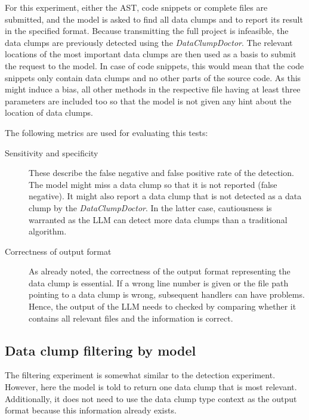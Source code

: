 For this experiment, either the \ac{AST}, code snippets or complete files are submitted, and the model is asked to find all data clumps and to report its result in the specified format.
Because transmitting the full project is infeasible, the data clumps are previously detected using the \textit{DataClumpDoctor}. The relevant locations of the most important data clumps are then used as a basis to submit the request to the model. In case of code snippets, this would mean that the code snippets only contain data clumps and no other parts of the source code. As this might induce a bias, all other methods in the respective file having at least three parameters are included too so that the model is not given any hint about the location of data clumps. 


The following metrics are used for evaluating this tests:

\begin{description}
    \item[Sensitivity and specificity] These describe the false negative and false positive rate of the detection. The model might miss a data clump so that it is not reported (false negative). It might also report  a data clump that is not detected as a data clump by the \textit{DataClumpDoctor}. In the latter case, cautiousness is warranted as the \ac{LLM} can detect more data clumps than a traditional algorithm. 

    \item[Correctness of output format]

    As already noted, the correctness of the output format representing the data clump is essential. If a wrong line number is given or the file path pointing to a data clump is wrong, subsequent handlers can have problems. Hence, the output of the \ac{LLM} needs to checked by comparing whether it contains all relevant files and the information is correct. 
   
\end{description}

\subsection{Data clump filtering by model}
The filtering experiment is somewhat similar to the detection experiment. However, here the model is told to return one data clump that is most relevant. Additionally, it does not need to use the data clump type context as the output format because this information already exists. 

